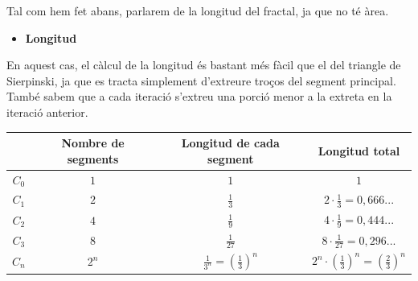 \documentclass[12pt]{report}
\begin{document}
Tal com hem fet abans, parlarem de la longitud del fractal, ja que no té àrea.
\newline
\newline
\newline
\newline
\newline
\newline

\begin{itemize}
\item \textbf{Longitud}
\end{itemize}
En aquest cas, el càlcul de la longitud és bastant més fàcil que el del triangle de Sierpinski, ja que es tracta simplement d'extreure troços del segment principal. També sabem que a cada iteració s'extreu una porció menor a la extreta en la iteració anterior.
\newline
\newline
\begin{tabular}{|c |c |c |c |}
\hline
& Nombre de segments & Longitud de cada segment & Longitud total \\
\hline

\newline
$C_0$ & $1$ & $1$ & $1$ \\[0,5cm]
\hline

$C_1$ & $2$ & $\frac{1}{3}$ & $2\cdot\frac{1}{3}=0,666...$ \\[0,5cm]
\hline

$C_2$ & $4$ & $\frac{1}{9}$ & $4\cdot\frac{1}{9}=0,444...$\\[0,5cm]
\hline

$C_3$ & $8$ & $\frac{1}{27}$ & $8\cdot\frac{1}{27}=0,296...$\\[0,5cm]
\hline
$C_n$ & $2^n$ & $\frac{1}{3^n}=(\frac{1}{3})^n$ & $2^n\cdot(\frac{1}{3})^n=(\frac{2}{3})^n$\\[0,5cm]
\hline
\end{tabular}
\newpage
\end{document}
